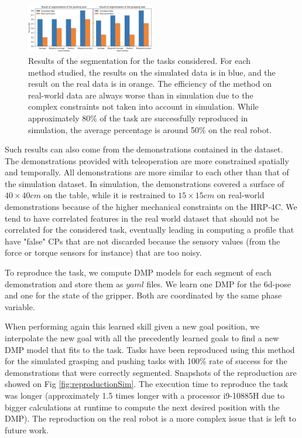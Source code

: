 \documentclass[conference]{IEEEtran}
\begin{document}
\begin{figure}[t]
  \centering
  \includegraphics[width=0.5\textwidth]{img/results_segmentation.png}
  \caption{Results of the segmentation for the tasks considered. For each method studied, the results on the simulated data is in blue, and the result on the real data is in orange. The efficiency of the method on real-world data are always worse than in simulation due to the complex constraints not taken into account in simulation. While approximately 80\% of the task are successfully reproduced in simulation, the average percentage is around 50\% on the real robot.}
  \label{fig:resultsSeg}
\end{figure}

Such results can also come from the demonstrations contained in the dataset. The demonstrations provided with teleoperation are more constrained spatially and temporally. All demonstrations are more similar to each other than that of the simulation dataset. In simulation, the demonstrations covered a surface of $40 \times 40 cm$ on the table, while it is restrained to $15 \times 15 cm$ on real-world demonstrations because of the higher mechanical constraints on the HRP-4C.  We tend to have correlated features in the real world dataset that should not be correlated for the considered task, eventually leading in computing a profile that have "false" CPs that are not discarded because the sensory values (from the force or torque sensors for instance) that are too noisy. \newline

To reproduce the task, we compute DMP models for each segment of each demonstration and store them as $yaml$ files. We learn one DMP for the 6d-pose and one for the state of the gripper. Both are coordinated by the same phase variable.

When performing again this learned skill given a new goal position, we interpolate the new goal with all the precedently learned goals to find a new DMP model that fits to the task. Tasks have been reproduced using this method for the simulated grasping and pushing tasks with 100\% rate of success for the demonstrations that were correctly segmented. Snapshots of the reproduction are showed on Fig \ref{fig:reproductionSim}. The execution time to reproduce the task was longer (approximately 1.5 times longer with a processor i9-10885H due to bigger calculations at runtime to compute the next desired position with the DMP). The reproduction on the real robot is a more complex issue that is left to future work. 
\end{document}
